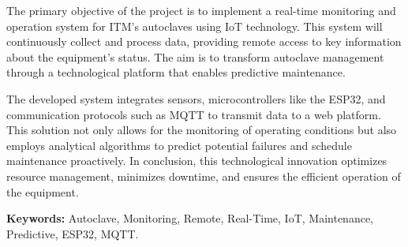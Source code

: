 The primary objective of the project is to implement a real-time monitoring and operation system for ITM’s autoclaves using IoT technology. This system will continuously collect and process data, providing remote access to key information about the equipment's status. The aim is to transform autoclave management through a technological platform that enables predictive maintenance.

The developed system integrates sensors, microcontrollers like the ESP32, and communication protocols such as MQTT to transmit data to a web platform. This solution not only allows for the monitoring of operating conditions but also employs analytical algorithms to predict potential failures and schedule maintenance proactively. In conclusion, this technological innovation optimizes resource management, minimizes downtime, and ensures the efficient operation of the equipment.

\textbf{Keywords:} Autoclave, Monitoring, Remote, Real-Time, IoT, Maintenance, Predictive, ESP32, MQTT.